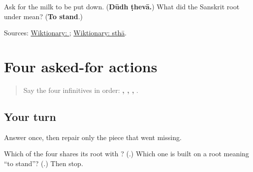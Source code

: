 \begin{tcolorbox}[breakable,colback=teal!4,colframe=teal!35!black,title={Before you move on}]
Ask for the milk to be put down. (\textbf{Dūdh ṭhevā.}) What did the Sanskrit root under \textbf{} mean? (\textbf{To stand}.)

Sources: \href{https://en.wiktionary.org/wiki/\%E0\%A4\%A0\%E0\%A5\%87\%E0\%A4\%B5\%E0\%A4\%A3\%E0\%A5\%87}{Wiktionary: }; \href{https://en.wiktionary.org/wiki/\%E0\%A4\%B8\%E0\%A5\%8D\%E0\%A4\%A5\%E0\%A4\%BE}{Wiktionary: sthā}.
\end{tcolorbox}
\section[\texorpdfstring{\mr{द्या} / \mr{प्या} / \mr{आणा} … (dyā / pyā / āṇā …)}{द्या / प्या / आणा … (dyā / pyā / āṇā …)}]{Four asked-for actions}

\label{lesson:MR-R22-request-verbs}



\begin{quote}
Say the four infinitives in order: \textbf{, , , }.
\end{quote}

\subsection*{Your turn}
Answer once, then repair only the piece that went missing.

\begin{tcolorbox}[breakable,colback=teal!4,colframe=teal!35!black,title={Before you move on}]
Which of the four shares its root with \textbf{}? (\textbf{}.) Which one is built on a root meaning \textquotedblleft{}to stand\textquotedblright{}? (\textbf{}.) Then stop.
\end{tcolorbox}
